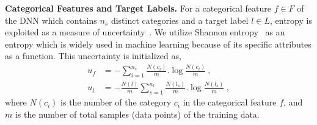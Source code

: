 \noindent
\textbf{Categorical Features and Target Labels.}
For a categorical feature $f \in F$ of the DNN which contains $n_s$ distinct categories and a target label $l \in L$, entropy is exploited as a measure of uncertainty~\cite{uncer5}. We utilize Shannon entropy~\cite{shannon} as an entropy which is widely used in machine learning because of its specific attributes as a function. This uncertainty is initialized as,
\begin{align}
u_{f} &= - \sum_{i=1}^{n_s} \frac{N(c_i)}{m}.\log \frac{N(c_i)}{m}\ , \\
u_{l} &= - \frac{N(l)}{m} \sum_{s=1}^{n_l} \frac{N(l_s)}{m}.\log \frac{N(l_s)}{m}\ ,
\label{cat_u}    
\end{align}
where $N(c_i)$ is the number of the category $c_i$ in the categorical feature $f$, and $m$ is the number of total samples (data points) of the training data. 



